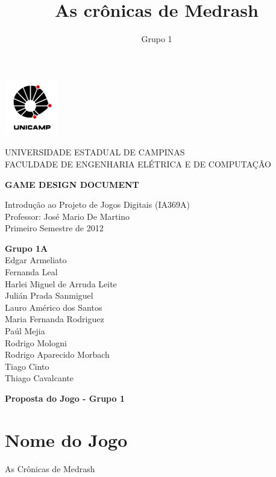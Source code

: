 \documentclass[letterpaper,11pt]{article}
\title{ As cr\^{o}nicas de Medrash }
\author{ Grupo 1 }
\date{}
\begin{document}
\begin{center}
\begin{minipage}{2.4 cm}
\begin{center}
\includegraphics{logo.png}
\end{center}
\end{minipage}
\begin{minipage}{12 cm}
\begin{center}
\Large
UNIVERSIDADE ESTADUAL DE CAMPINAS \\
FACULDADE DE ENGENHARIA ELÉTRICA E DE COMPUTAÇÃO
\end{center}
\end{minipage}
\end{center}

\vspace{6 cm}
\begin{center}
{\bf \large GAME DESIGN DOCUMENT}
\vspace{0.5 cm}

Introdução ao Projeto de Jogos Digitais (IA369A) \\
Professor: José Mario De Martino \\
Primeiro Semestre de 2012
\end{center}
\vspace{3 cm}
\begin{flushright}
{\bf Grupo 1A} \\
Edgar Armeliato \\
Fernanda Leal \\
Harlei Miguel de Arruda Leite \\
Julián Prada Sanmiguel \\
Lauro Américo dos Santos \\
Maria Fernanda Rodriguez \\
Paúl Mejia \\
Rodrigo Mologni \\
Rodrigo Aparecido Morbach \\
Tiago Cinto \\
Thiago Cavalcante
\end{flushright}

\newpage
\tableofcontents
\newpage

{\bf Proposta do Jogo - Grupo 1}

\section{Nome do Jogo}

As Crônicas de Medrash











\end{document}
